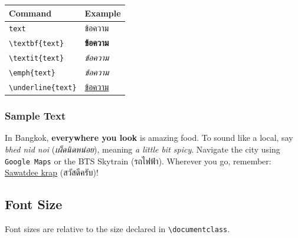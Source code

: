                 \begin{table}[h]
                    \centering
                    \setlength{\extrarowheight}{2pt}
                    \begin{tabular}{ll}
                        \toprule
                        \textbf{Command} & \textbf{Example} \\
                        \midrule
                        \texttt{text} & ข้อความ \\
                        \texttt{\textbackslash textbf\{text\}} & \textbf{ข้อความ} \\
                        \texttt{\textbackslash textit\{text\}} & \textit{ข้อความ} \\
                        \texttt{\textbackslash emph\{text\}} & \emph{ข้อความ} \\
                        \texttt{\textbackslash underline\{text\}} & \underline{ข้อความ} \\
                        \bottomrule
                    \end{tabular}
                \end{table}

            \subsubsection{Sample Text}

                In Bangkok, \textbf{everywhere you look} is amazing food. To sound like a local, say \textit{bhed nid noi}
                (\textit{เผ็ดนิดหน่อย}), meaning \emph{a little bit spicy}. Navigate the city using \texttt{Google Maps}
                or the \textsf{BTS Skytrain} (\textnormal{รถไฟฟ้า}). Wherever you go, remember: \underline{Sawatdee krap}
                (\textnormal{สวัสดีครับ})!

        \subsection{Font Size}

            Font sizes are relative to the size declared in \texttt{\textbackslash documentclass}.

